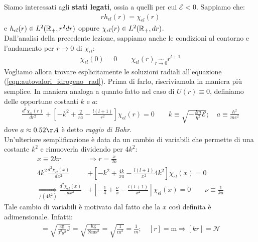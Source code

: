 \documentclass[../../FisicaTeorica.tex]{subfiles}
\begin{document}
Siamo interessati agli \textbf{stati legati}, ossia a quelli per cui $\mathcal{E}<0$. Sappiamo che:
\begin{align*}
rh_{\epsilon l}(r) = \chi_{\epsilon l}(r)
\end{align*}
e $h_{\epsilon l}(r) \in L^2(\mathbb{R}_+, r^2 dr)$ oppure $\chi_{\epsilon l}(r) \in L^2(\mathbb{R}_+, dr)$.\\
Dall'analisi della precedente lezione, sappiamo anche le condizioni al contorno e l'andamento per $r\to 0$ di $\chi_{\epsilon l}$:
\begin{align*}
\chi_{\epsilon l}(0) = 0 \qquad \chi_{\epsilon l}(r) \underset{r \to 0}{\sim} r^{l+1}
\end{align*}
Vogliamo allora trovare esplicitamente le soluzioni radiali all'equazione (\ref{eqn:autovalori_idrogeno_rad}). Prima di farlo, riscriviamola in maniera più semplice. In maniera analoga a quanto fatto nel caso di $U(r) \equiv 0$, definiamo delle opportune costanti $k$ e $a$:
\begin{align*}
\frac{d^2 \chi_{\epsilon l}(r)}{dr^2} + \left[-k^2 + \frac{2}{ra} - \frac{l(l+1)}{r^2}\right] \chi_{\epsilon l}(r)=0 \qquad k \equiv \sqrt{-\frac{2m}{\hbar^2}\mathcal{E}}; \quad a \equiv \frac{\hbar^2}{me^2}
\end{align*}
dove $a \approx 0.52 \AA$ è detto \textit{raggio di Bohr}.\\
Un'ulteriore semplificazione è data da un cambio di variabili che permette di  una costante $k^2$ e rimuoverla dividendo per $4k^2$:
\begin{align}\nonumber
x \equiv 2kr &\Rightarrow  r=\frac{x}{2k}\\ \nonumber
4k^2\frac{d^2 \chi_{\epsilon l}(x)}{dx^2} &+\left[-k^2 + \frac{4k}{xa} - \frac{l(l+1)}{x^2}4k^2 \right] \chi_{\epsilon l}(x) =0\\
\underset{/(4k^2)}{\Rightarrow} \frac{d^2 \chi_{\epsilon l}(x)}{dx^2}&+\left[-\frac{1}{4} + \frac{\nu}{x} - \frac{l(l+1)}{x^2} \right] \chi_{\epsilon l}(x) = 0 \qquad \nu\equiv \frac{1}{ka}
\label{eqn:equazione-radiale-idrogeno-semplificata}
\end{align}
Tale cambio di variabili è motivato dal fatto che la $x$ così definita è adimensionale. Infatti:
\begin{align*}
[k] = \sqrt{\frac{\si{\kilogram}}{\si{\joule}^2 \si{\second}^2}\si{\joule}} = \sqrt{\frac{\si{\kilogram}}{\si{\newton\meter \second^2}}}=\sqrt{\frac{1}{\si{\meter^2}}}=\frac{1}{m}; \quad [r]=\si{\meter} \Rightarrow [kr]=\mathcal{N}
\end{align*}
\end{document}
